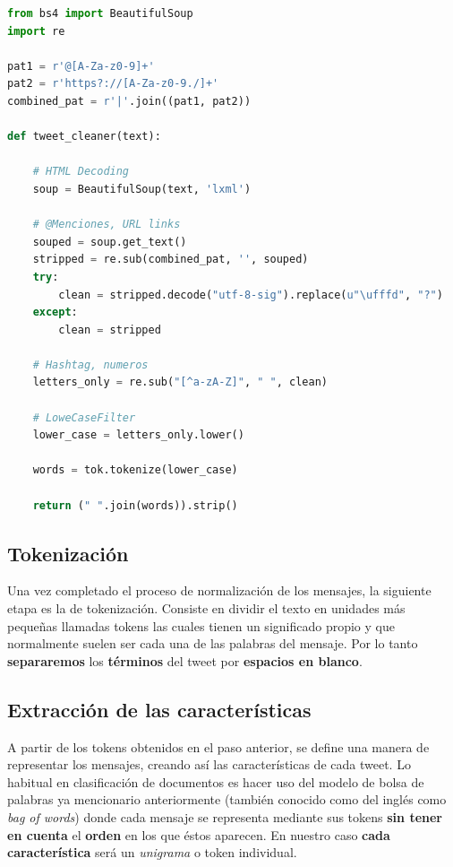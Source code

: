 \documentclass[a4paper,12pt]{report}
\begin{document}
\vspace{2mm}
\begin{lstlisting}[language=Python]
from bs4 import BeautifulSoup
import re

pat1 = r'@[A-Za-z0-9]+'
pat2 = r'https?://[A-Za-z0-9./]+'
combined_pat = r'|'.join((pat1, pat2))

def tweet_cleaner(text):
    
    # HTML Decoding
    soup = BeautifulSoup(text, 'lxml')
    
    # @Menciones, URL links
    souped = soup.get_text()
    stripped = re.sub(combined_pat, '', souped)
    try:
        clean = stripped.decode("utf-8-sig").replace(u"\ufffd", "?")
    except:
        clean = stripped
    
    # Hashtag, numeros
    letters_only = re.sub("[^a-zA-Z]", " ", clean)
    
    # LoweCaseFilter
    lower_case = letters_only.lower()
    
    words = tok.tokenize(lower_case)
    
    return (" ".join(words)).strip()

\end{lstlisting}


\subsection{Tokenización}

{\setlength{\parindent}{0cm}
Una vez completado el proceso de normalización de los mensajes, la siguiente etapa es la de tokenización. Consiste en dividir el texto en unidades más pequeñas llamadas tokens las cuales tienen un significado propio y que normalmente suelen ser cada una de las palabras del mensaje. Por lo tanto \textbf{separaremos } los \textbf{términos} del tweet por \textbf{espacios en blanco}. }

\vspace{4mm}
\subsection{Extracción de las características}

{\setlength{\parindent}{0cm}
A partir de los tokens obtenidos en el paso anterior, se define una manera de representar los mensajes, creando así las características de cada tweet. Lo habitual en clasificación de documentos es hacer uso del modelo de bolsa de palabras ya mencionario anteriormente (también conocido como del inglés como \textit{bag of words}) donde cada mensaje se representa mediante sus tokens \textbf{sin tener en cuenta} el \textbf{orden} en los que éstos aparecen. En nuestro caso \textbf{cada característica} será un \textit{unigrama} o token individual. }
\end{document}
